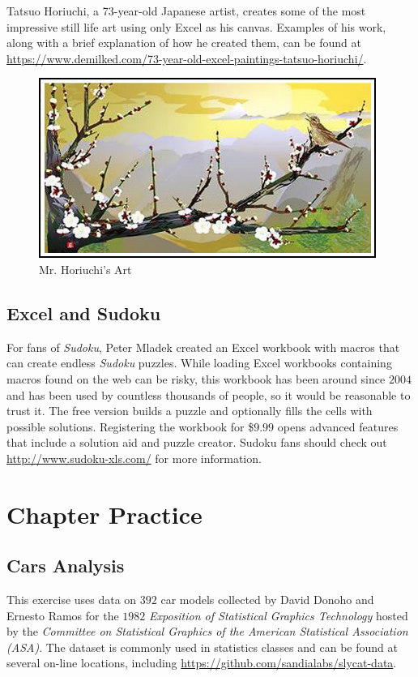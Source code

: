 Tatsuo Horiuchi, a 73-year-old Japanese artist, creates some of the most impressive still life art using only Excel as his canvas. Examples of his work, along with a brief explanation of how he created them, can be found at \url{https://www.demilked.com/73-year-old-excel-paintings-tatsuo-horiuchi/}. 

\begin{figure}[H]
	\centering
	\includegraphics[width=\maxwidth{.75\linewidth}]{gfx/ch09_fig69}
	\caption{Mr. Horiuchi's Art}
	\label{09:fig69}
\end{figure}

\subsection{Excel and Sudoku}

For fans of \textit{Sudoku}, Peter Mladek created an Excel workbook with macros that can create endless \textit{Sudoku} puzzles. While loading Excel workbooks containing macros found on the web can be risky, this workbook has been around since $ 2004 $ and has been used by countless thousands of people, so it would be reasonable to trust it. The free version builds a puzzle and optionally fills the cells with possible solutions. Registering the workbook for \$$ 9.99 $ opens advanced features that include a solution aid and puzzle creator. Sudoku fans should check out \url{http://www.sudoku-xls.com/} for more information.

\section{Chapter Practice}

\subsection{Cars Analysis}

This exercise uses data on $ 392 $ car models collected by David Donoho and Ernesto Ramos for the $ 1982 $ \textit{Exposition of Statistical Graphics Technology} hosted by the \textit{Committee on Statistical Graphics of the American Statistical Association (ASA)}. The dataset is commonly used in statistics classes and can be found at several on-line locations, including \url{https://github.com/sandialabs/slycat-data}.

